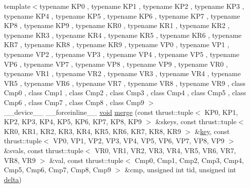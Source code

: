 \begin{DoxyCompactItemize}
{\footnotesize template$<$typename K\-P0 , typename K\-P1 , typename K\-P2 , typename K\-P3 , typename K\-P4 , typename K\-P5 , typename K\-P6 , typename K\-P7 , typename K\-P8 , typename K\-P9 , typename K\-R0 , typename K\-R1 , typename K\-R2 , typename K\-R3 , typename K\-R4 , typename K\-R5 , typename K\-R6 , typename K\-R7 , typename K\-R8 , typename K\-R9 , typename V\-P0 , typename V\-P1 , typename V\-P2 , typename V\-P3 , typename V\-P4 , typename V\-P5 , typename V\-P6 , typename V\-P7 , typename V\-P8 , typename V\-P9 , typename V\-R0 , typename V\-R1 , typename V\-R2 , typename V\-R3 , typename V\-R4 , typename V\-R5 , typename V\-R6 , typename V\-R7 , typename V\-R8 , typename V\-R9 , class Cmp0 , class Cmp1 , class Cmp2 , class Cmp3 , class Cmp4 , class Cmp5 , class Cmp6 , class Cmp7 , class Cmp8 , class Cmp9 $>$ }\\\-\_\-\-\_\-device\-\_\-\-\_\- \-\_\-\-\_\-forceinline\-\_\-\-\_\- \hyperlink{legacy_8hpp_a8bb47f092d473522721002c86c13b94e}{void} \hyperlink{namespacecv_1_1gpu_1_1device_1_1reduce__key__val__detail_a0d518c78430d93d62e67585bdb7f7a09}{merge} (const thrust\-::tuple$<$ K\-P0, K\-P1, K\-P2, K\-P3, K\-P4, K\-P5, K\-P6, K\-P7, K\-P8, K\-P9 $>$ \&skeys, const thrust\-::tuple$<$ K\-R0, K\-R1, K\-R2, K\-R3, K\-R4, K\-R5, K\-R6, K\-R7, K\-R8, K\-R9 $>$ \&\hyperlink{core__c_8h_a68cf695b604d08c0b6f6f6bb282a6586}{key}, const thrust\-::tuple$<$ V\-P0, V\-P1, V\-P2, V\-P3, V\-P4, V\-P5, V\-P6, V\-P7, V\-P8, V\-P9 $>$ \&svals, const thrust\-::tuple$<$ V\-R0, V\-R1, V\-R2, V\-R3, V\-R4, V\-R5, V\-R6, V\-R7, V\-R8, V\-R9 $>$ \&val, const thrust\-::tuple$<$ Cmp0, Cmp1, Cmp2, Cmp3, Cmp4, Cmp5, Cmp6, Cmp7, Cmp8, Cmp9 $>$ \&cmp, unsigned int tid, unsigned int \hyperlink{legacy_8hpp_ac867054f00f4be8b1f3ebce6fba31982}{delta})
\end{DoxyCompactItemize}


